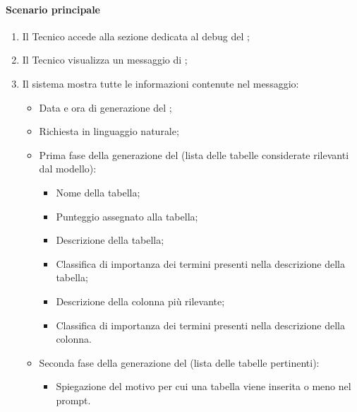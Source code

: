 \paragraph*{Scenario principale}
\begin{enumerate}
  \item Il Tecnico accede alla sezione dedicata al debug del ;
  \item Il Tecnico visualizza un messaggio di ;
  \item Il sistema mostra tutte le informazioni contenute nel messaggio:
    \begin{itemize}
      \item Data e ora di generazione del ;
      \item Richiesta in linguaggio naturale;
      \item Prima fase della generazione del  (lista delle tabelle considerate rilevanti dal modello):
      \begin{itemize}
        \item Nome della tabella;
        \item Punteggio assegnato alla tabella;
        \item Descrizione della tabella;
        \item Classifica di importanza dei termini presenti nella descrizione della tabella;
        \item Descrizione della colonna più rilevante;
        \item Classifica di importanza dei termini presenti nella descrizione della colonna.
      \end{itemize}
      \item Seconda fase della generazione del  (lista delle tabelle pertinenti):
      \begin{itemize}
        \item Spiegazione del motivo per cui una tabella viene inserita o meno nel prompt.
      \end{itemize}
    \end{itemize}
\end{enumerate}